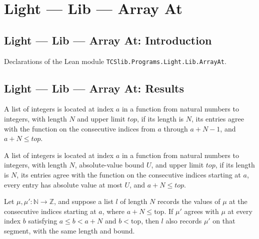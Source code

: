 \section{Light --- Lib --- Array At}
\subsection*{Light --- Lib --- Array At: Introduction}

Declarations of the Lean module \texttt{TCSlib.Programs.Light.Lib.ArrayAt}.

\subsection*{Light --- Lib --- Array At: Results}

\begin{definition}
\label{Light.ListAt}
\leanok
{}
A list of integers is located at index $a$ in a function from natural numbers to
integers, with length $N$ and upper limit $top$, if its length is $N$, its entries agree
with the function on the consecutive indices from $a$ through $a+N-1$, and $a+N\le top$.
\end{definition}

\begin{definition}
\label{Light.ArrayAt}
\leanok
{}
A list of integers is located at index $a$ in a function from natural numbers to
integers, with length $N$, absolute-value bound $U$, and upper limit $top$, if its
length is $N$, its entries agree with the function on the consecutive indices starting
at $a$, every entry has absolute value at most $U$, and $a+N\le top$.
\end{definition}

\begin{theorem}
\label{Light.ListAt.keep}
\leanok
{}
Let $\mu,\mu':\mathbb N\to\mathbb Z$, and suppose a list $l$ of length $N$ records the
values of $\mu$ at the consecutive indices starting at $a$, where $a+N\le\mathrm{top}$.
If $\mu'$ agrees with $\mu$ at every index $b$ satisfying $a\le b<a+N$ and
$b<\mathrm{top}$, then $l$ also records $\mu'$ on that segment, with the same length and
bound.
\end{theorem}

